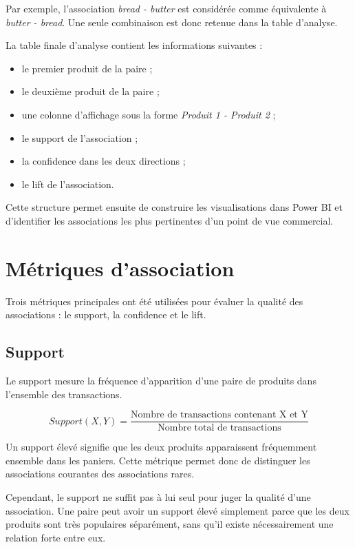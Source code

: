 \documentclass[12pt,a4paper,twoside]{report}
\begin{document}
Par exemple, l'association \textit{bread - butter} est considérée comme équivalente à \textit{butter - bread}. Une seule combinaison est donc retenue dans la table d'analyse.

La table finale d'analyse contient les informations suivantes :

\begin{itemize}
  \item le premier produit de la paire ;
  \item le deuxième produit de la paire ;
  \item une colonne d'affichage sous la forme \textit{Produit 1 - Produit 2} ;
  \item le support de l'association ;
  \item la confidence dans les deux directions ;
  \item le lift de l'association.
\end{itemize}

Cette structure permet ensuite de construire les visualisations dans Power BI et d'identifier les associations les plus pertinentes d'un point de vue commercial.

\section{Métriques d'association}

Trois métriques principales ont été utilisées pour évaluer la qualité des associations : le support, la confidence et le lift.

\subsection{Support}

Le support mesure la fréquence d'apparition d'une paire de produits dans l'ensemble des transactions.

\[
Support(X,Y) = \frac{\text{Nombre de transactions contenant X et Y}}{\text{Nombre total de transactions}}
\]

Un support élevé signifie que les deux produits apparaissent fréquemment ensemble dans les paniers. Cette métrique permet donc de distinguer les associations courantes des associations rares.

Cependant, le support ne suffit pas à lui seul pour juger la qualité d'une association. Une paire peut avoir un support élevé simplement parce que les deux produits sont très populaires séparément, sans qu'il existe nécessairement une relation forte entre eux.
\end{document}

